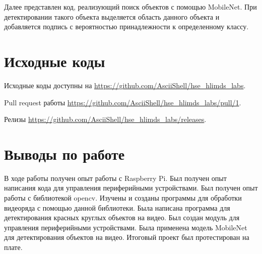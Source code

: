 \documentclass[a4paper,14pt]{article}
\begin{document}
    Далее представлен код, реализующий поиск объектов с помощью MobileNet.
    При детектировании такого объекта выделяется область данного объекта и добавляется подпись с вероятностью принадлежности к определенному классу.

    {\small {}}


    \section{Исходные коды}

    Исходные коды доступны на \href{https://github.com/AsciiShell/hse_hlimds_labs}
    {https://github.com/AsciiShell/hse\_hlimds\_labs}.

    Pull request работы \href{https://github.com/AsciiShell/hse_hlimds_labs/pull/1}
    {https://github.com/AsciiShell/hse\_hlimds\_labs/pull/1}.

    Релизы \href{https://github.com/AsciiShell/hse_hlimds_labs/releases}
    {https://github.com/AsciiShell/hse\_hlimds\_labs/releases}.


    \section{Выводы по работе}

    В ходе работы получен опыт работы с Raspberry Pi.
    Был получен опыт написания кода для управления периферийными устройствами.
    Был получен опыт работы с библиотекой opencv.
    Изучены и созданы программы для обработки видеоряда с помощью данной библиотеки.
    Была написана программа для детектирования красных круглых объектов на видео.
    Был создан модуль для управления периферийными устройствами.
    Была применена модель MobileNet для детектирования объектов на видео.
    Итоговый проект был протестирован на плате.
\end{document}
